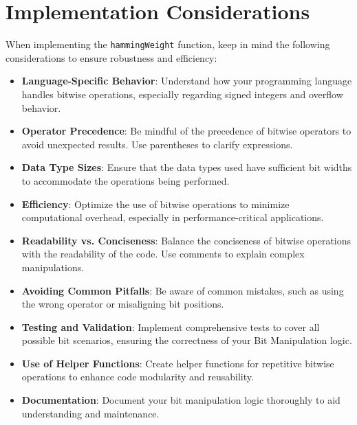 \section*{Implementation Considerations}

When implementing the \texttt{hammingWeight} function, keep in mind the following considerations to ensure robustness and efficiency:

\begin{itemize}
    \item \textbf{Language-Specific Behavior}: Understand how your programming language handles bitwise operations, especially regarding signed integers and overflow behavior.
    
    \item \textbf{Operator Precedence}: Be mindful of the precedence of bitwise operators to avoid unexpected results. Use parentheses to clarify expressions.
    
    \item \textbf{Data Type Sizes}: Ensure that the data types used have sufficient bit widths to accommodate the operations being performed.
    
    \item \textbf{Efficiency}: Optimize the use of bitwise operations to minimize computational overhead, especially in performance-critical applications.
    
    \item \textbf{Readability vs. Conciseness}: Balance the conciseness of bitwise operations with the readability of the code. Use comments to explain complex manipulations.
    
    \item \textbf{Avoiding Common Pitfalls}: Be aware of common mistakes, such as using the wrong operator or misaligning bit positions.
    
    \item \textbf{Testing and Validation}: Implement comprehensive tests to cover all possible bit scenarios, ensuring the correctness of your Bit Manipulation logic.
    
    \item \textbf{Use of Helper Functions}: Create helper functions for repetitive bitwise operations to enhance code modularity and reusability.
    
    \item \textbf{Documentation}: Document your bit manipulation logic thoroughly to aid understanding and maintenance.
\end{itemize}

